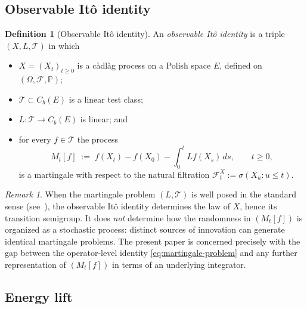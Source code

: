 \documentclass[11pt,reqno]{amsart}
\theoremstyle{plain}
\theoremstyle{definition}
\newtheorem{definition}[theorem]{Definition}
\theoremstyle{remark}
\newtheorem{remark}[theorem]{Remark}
\newcommand{\Prob}{\mathbb{P}}
\begin{document}
\subsection{\texorpdfstring{Observable It\^o identity}{Observable Ito identity}}\label{sec:def-observable}

\begin{definition}[\texorpdfstring{Observable It\^o identity}{Observable Ito identity}]\label{def:observable}
An \emph{observable It\^o identity} is a triple $(X,L,\mathcal T)$ in
which
\begin{itemize}
\item[$(\mathrm i)$] $X=(X_t)_{t\ge 0}$ is a c\`adl\`ag process on a
Polish space $E$, defined on $(\Omega,\mathcal F,\Prob)$;
\item[$(\mathrm{ii})$] $\mathcal T\subset C_b(E)$ is a linear test class;
\item[$(\mathrm{iii})$] $L\colon\mathcal T\to C_b(E)$ is linear; and
\item[$(\mathrm{iv})$] for every $f\in\mathcal T$ the process
\begin{equation}\label{eq:martingale-problem}
  M_t[f]\;:=\;f(X_t)-f(X_0)-\int_0^t Lf(X_s)\,ds,\qquad t\ge 0,
\end{equation}
is a martingale with respect to the natural filtration
$\mathcal F^X_t:=\sigma(X_u:u\le t)$.
\end{itemize}
\end{definition}

\begin{remark}\label{rem:observable-semigroup}
When the martingale problem $(L,\mathcal T)$ is well posed in the
standard sense (see~\cite{EthierKurtz}), the observable It\^o
identity determines the law of $X$, hence its transition semigroup.
It does \emph{not} determine how the randomness in $(M_t[f])$ is
organized as a stochastic process: distinct sources of innovation
can generate identical martingale problems. The present paper is
concerned precisely with the gap between the operator-level identity
\eqref{eq:martingale-problem} and any further representation of
$(M_t[f])$ in terms of an underlying integrator.
\end{remark}

\subsection{Energy lift}\label{sec:def-energy}
\end{document}

